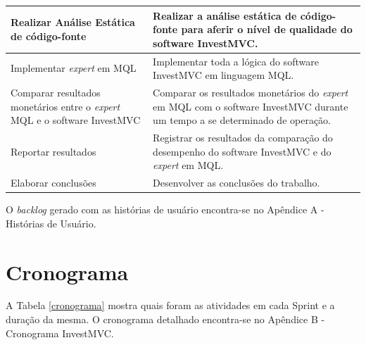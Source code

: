 \begin{center}
\begin{longtable}{| p{8cm} | p{8cm} |}
	Realizar Análise Estática de código-fonte & Realizar a análise estática de código-fonte para aferir o nível de qualidade do  software InvestMVC.\\ \hline
	Implementar \textit{expert} em MQL & Implementar toda a lógica do software InvestMVC em linguagem MQL.\\ \hline
	Comparar resultados monetários entre o \textit{expert} MQL e o software InvestMVC & Comparar os resultados monetários do \textit{expert} em MQL com o software InvestMVC durante um tempo a se determinado de operação.\\ \hline
	Reportar resultados & Registrar os resultados da comparação do desempenho do software InvestMVC e do \textit{expert} em MQL.\\ \hline
	Elaborar conclusões & Desenvolver as conclusões do trabalho.
\label{atividadeMetologia}
\end{longtable}
\end{center}

O \textit{backlog} gerado com as histórias de usuário encontra-se no Apêndice A - Histórias de Usuário.

\section{Cronograma}

A Tabela \ref{cronograma} mostra quais foram as atividades em cada Sprint e a duração da mesma. O cronograma detalhado encontra-se no Apêndice B - Cronograma InvestMVC.

